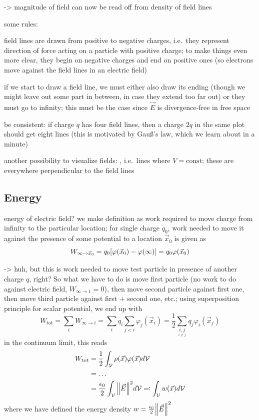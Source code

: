 \documentclass[../class_mech_main.tex]{subfiles}
\begin{document}
-> magnitude of field can now be read off from density of field lines


some rules:

field lines are drawn from positive to negative charges, i.e.~they represent direction of force acting on a particle with positive charge; to make things even more clear, they begin on negative charges and end on positive ones (so electrons move against the field lines in an electric field)

if we start to draw a field line, we must either also draw its ending (though we might leave out some part in between, in case they extend too far out) or they must go to infinity; this must be the case since $\vec{E}$ is divergence-free in free space

be consistent: if charge $q$ has four field lines, then a charge $2q$ in the same plot should get eight lines (this is motivated by Gauß's law, which we learn about in a minute)


another possibility to visualize fields: , i.e.~lines where $V = \mathrm{const}$; these are everywhere perpendicular to the field lines



        \subsection{Energy}

energy of electric field? we make definition as work required to move charge from infinity to the particular location; for single charge $q_0$, work needed to move it against the presence of some potential to a location $\vec{x}_0$ is given as
\begin{equation}
    W_{\infty \rightarrow \vec{x}_0} = q_0 \qty[\varphi(\vec{x}_0) - \varphi(\infty)] = q_0 \varphi(\vec{x}_0)
\end{equation}

-> huh, but this is work needed to move test particle in presence of another charge $q$, right? So what we have to do is move first particle (no work to do against electric field, $W_{\infty \rightarrow 1} = 0$), then move second particle against first one, then move third particle against first + second one, etc.; using superposition principle for scalar potential, we end up with
\begin{equation}
    W_\mathrm{tot} = \sum_i W_{\infty \rightarrow i}
    = \sum_i q_i \sum_{j < i} \varphi_j(\vec{x}_i)
    = \frac{1}{2} \sum_{\underset{i \neq j}{i, j}} q_j \varphi_i(\vec{x}_j)
\end{equation}
in the continuum limit, this reads
\begin{align}
    W_\mathrm{tot} &= \frac{1}{2} \int_{\mathcal{V}} \rho(\vec{x}) \varphi(\vec{x}) d\mathcal{V}
    \\
    &= \ldots
    \notag\\
    &= \frac{\epsilon_0}{2} \int_{\mathcal{V}} \norm{\vec{E}}^2 d\mathcal{V} \eqqcolon \int_{\mathcal{V}} w(\vec{x}) d\mathcal{V}
\end{align}
where we have defined the energy density $w = \frac{\epsilon_0}{2} \norm{\vec{E}}^2$
\end{document}
